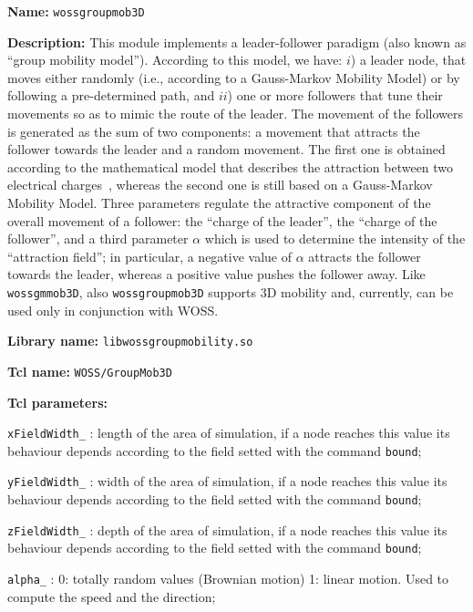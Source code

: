 \begin{description}
   \item {\bf Name:} {\tt wossgroupmob3D}
   \item {\bf Description:} This module implements a leader-follower paradigm (also known as ``group mobility model''). According to this model, we have: $i$) a leader node, that moves either randomly (i.e., according to a Gauss-Markov Mobility Model) or by following a pre-determined path, and $ii$) one or more followers that tune their movements so as to mimic the route of the leader. The movement of the followers is generated as the sum of two components: a movement that attracts the follower towards the leader and a random movement. The first one is obtained according to the mathematical model that describes the attraction between two electrical charges~\cite{BadiaBangkok}, whereas the second one is still based on a Gauss-Markov Mobility Model. Three parameters regulate the attractive component of the overall movement of a follower: the ``charge of the leader'', the ``charge of the follower'', and a third parameter $\alpha$ which is used to determine the intensity of the ``attraction field''; in 
particular, a negative value of $\alpha$ attracts the follower towards the leader, whereas a positive value pushes the follower away. Like {\tt wossgmmob3D}, also {\tt wossgroupmob3D} supports 3D mobility and, currently, can be used only in conjunction with WOSS.
   \item {\bf Library name:} {\tt libwossgroupmobility.so}
   \item {\bf Tcl name:} {\tt WOSS/GroupMob3D}
   \item {\bf Tcl parameters:} 
    \begin{description}
      \item {\tt xFieldWidth\_} : length of the area of simulation, if a node reaches this value its behaviour depends according to the field setted with the command {\tt bound};
      \item {\tt yFieldWidth\_} : width of the area of simulation, if a node reaches this value its behaviour depends according to the field setted with the command {\tt bound};
      \item {\tt zFieldWidth\_} : depth of the area of simulation, if a node reaches this value its behaviour depends according to the field setted with the command {\tt bound};
      \item {\tt alpha\_} : 0: totally random values (Brownian motion) 1: linear motion. Used to compute the speed and the direction;

\end{description}
\end{description}
